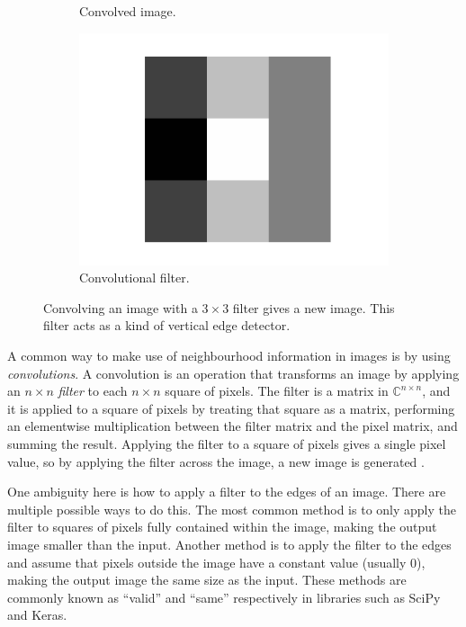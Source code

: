 \begin{figure}[!ht]
\begin{subfigure}[t]{0.5\textwidth}
                \caption{Convolved image.}
                \label{fig:convolution-face-convolved}
            \end{subfigure}
            \begin{subfigure}[t]{0.3\textwidth}
                \centering
                \includegraphics[width=\textwidth]
                    {images/convolutional_filter.png}
                \caption{Convolutional filter.}
                \label{fig:convolution-face-filter}
            \end{subfigure}
            \caption{Convolving an image with a $3 \times 3$ filter gives a new
                image. This filter acts as a kind of vertical edge detector.}
            \label{fig:convolved-face}
        \end{figure}

        A common way to make use of neighbourhood information in images is by
        using \emph{convolutions}. A convolution is an operation that transforms
        an image by applying an $n \times n$ \emph{filter} to each $n \times n$
        square of pixels. The filter is a matrix in $\mathbb{C}^{n \times n}$,
        and it is applied to a square of pixels by treating that square as a
        matrix, performing an elementwise multiplication between the filter
        matrix and the pixel matrix, and summing the result. Applying the filter
        to a square of pixels gives a single pixel value, so by applying the
        filter across the image, a new image is generated \citep{ludwig15}.

        One ambiguity here is how to apply a filter to the edges of an image.
        There are multiple possible ways to do this. The most common method is
        to only apply the filter to squares of pixels fully contained within the
        image, making the output image smaller than the input. Another method is
        to apply the filter to the edges and assume that pixels outside the
        image have a constant value (usually 0), making the output image the
        same size as the input. These methods are commonly known as ``valid''
        and ``same'' respectively in libraries such as SciPy and Keras.

